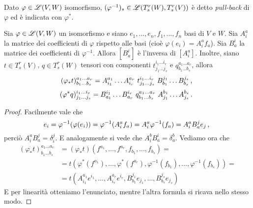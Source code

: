 \begin{definition} 
	Dato $\varphi \in \mathscr L(V,W)$ isomorfismo, $(\varphi^{-1})_* \in \mathscr L(T_s^r(W), T_s^r(V))$ è detto \emph{pull-back} di $\varphi$ ed è indicata con $\varphi^*$.
\end{definition}

\begin{proposition}
	Sia $\varphi\in \mathscr L(V,W)$ un isomorfismo e siano $e_1,\ldots,e_n,f_1,\ldots,f_n$ basi di $V$ e $W$.
	Sia $A_i^a$ la matrice dei coefficienti di $\varphi$ rispetto alle basi (cioè $\varphi(e_i) = A_i^af_a$).
	Sia $B_a^i$ la matrice dei coefficienti di $\varphi^{-1}$.
	Allora $[B_a^i]$ è l'inversa di $[A_i^a]$. Inoltre, siano $t\in T_s^r(V)$, $q\in T_s^r(W)$ tensori con componenti $t_{j_1 \ldots j_s}^{i_1 \ldots i_r}$ e $q_{b_1 \ldots b_s}^{a_1 \ldots a_r}$, allora
	\begin{equation*} 
		(\varphi_*t)_{b_1 \ldots b_s}^{a_1 \ldots a_r} = A_{i_1}^{a_1}\ldots A_{i_r}^{a_r}\ t_{j_1\ldots j_s}^{i_1 \ldots i_r}\ B_{b_1}^{j_1}\ldots B_{b_s}^{j_s} \, \text{, }
	\end{equation*}
	\begin{equation*}
		(\varphi^*q)_{j_1 \ldots j_s}^{i_1 \ldots i_r} =B_{a_1}^{i_1}\ldots B_{a_r}^{i_r}\ q_{b_1 \ldots b_s}^{a_1 \ldots a_r}\ A_{j_1}^{b_1}\ldots A_{j_s}^{b_s} \punto
	\end{equation*}
\end{proposition}

\begin{proof}
	Facilmente vale che
	\begin{equation*}
		e_i = \varphi^{-1}(\varphi(e_i)) = \varphi^{-1}(A_i^af_a) = A_i^a\varphi^{-1}(f_a) = A_i^a B_a^j e_j \, \text{, }
	\end{equation*}
	perciò $A_i^a B_a^j = \delta_i^j$. E analogamente si vede che $A_i^bB_a^i = \delta_a^b$. 
	Vediamo ora che
	\begin{align*}
		(\varphi_*t)_{b_1 \ldots b_s}^{a_1 \ldots a_r} &= (\varphi_*t)(f^{a_1},\ldots, f^{a_r},f_{b_1},\ldots,f_{b_s}) =\\
		&= t(\varphi^*(f^{a_1}),\ldots, \varphi^*(f^{a_r}),\varphi^{-1}(f_{b_1}),\ldots,\varphi^{-1}(f_{b_s})) =\\
		&=t (A_{i_1}^{a_1} e^{i_1}, \ldots, A_{i_r}^{a_r} e^{i_r},B_{b_1}^{j_1}e_{j_1}, \ldots, B_{b_s}^{j_s}e_{j_s})
	\end{align*}
	E per linearità otteniamo l'enunciato, mentre l'altra formula si ricava nello stesso modo.
\end{proof}


